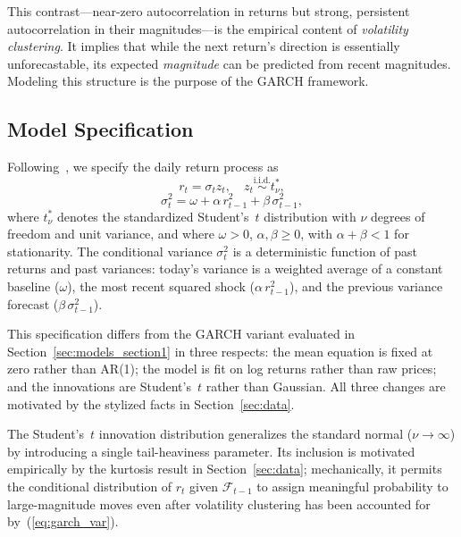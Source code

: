 \documentclass[journal]{IEEEtran}
\begin{document}
This contrast---near-zero autocorrelation in returns but strong,
persistent autocorrelation in their magnitudes---is the empirical content of
\emph{volatility clustering}.  It implies that while the next return's
direction is essentially unforecastable, its expected \emph{magnitude} can
be predicted from recent magnitudes.  Modeling this structure is the
purpose of the GARCH framework.

\subsection{Model Specification}
\label{sec:model}

Following~\cite{bollerslev1986,bollerslev1987}, we specify the daily
return process as
\begin{equation}
\label{eq:garch_main}
r_t = \sigma_t z_t,
\quad z_t \overset{\text{i.i.d.}}{\sim} t^{*}_\nu,
\end{equation}
\begin{equation}
\label{eq:garch_var}
\sigma_t^2 = \omega + \alpha\, r_{t-1}^2 + \beta\, \sigma_{t-1}^2,
\end{equation}
where $t^{*}_\nu$ denotes the standardized Student's~$t$ distribution with
$\nu$ degrees of freedom and unit variance, and where $\omega > 0$,
$\alpha, \beta \geq 0$, with $\alpha + \beta < 1$ for stationarity.  The
conditional variance $\sigma_t^2$ is a deterministic function of past
returns and past variances: today's variance is a weighted average of a
constant baseline ($\omega$), the most recent squared shock
($\alpha\,r_{t-1}^2$), and the previous variance forecast
($\beta\,\sigma_{t-1}^2$).

This specification differs from the GARCH variant evaluated in
Section~\ref{sec:models_section1} in three respects: the mean equation is
fixed at zero rather than AR(1); the model is fit on log returns rather
than raw prices; and the innovations are Student's~$t$ rather than
Gaussian.  All three changes are motivated by the stylized facts in
Section~\ref{sec:data}.

The Student's~$t$ innovation distribution generalizes the standard normal
($\nu \to \infty$) by introducing a single tail-heaviness parameter.  Its
inclusion is motivated empirically by the kurtosis result in
Section~\ref{sec:data}; mechanically, it permits the conditional
distribution of $r_t$ given $\mathcal{F}_{t-1}$ to assign meaningful
probability to large-magnitude moves even after volatility clustering has
been accounted for by~(\ref{eq:garch_var}).
\end{document}
